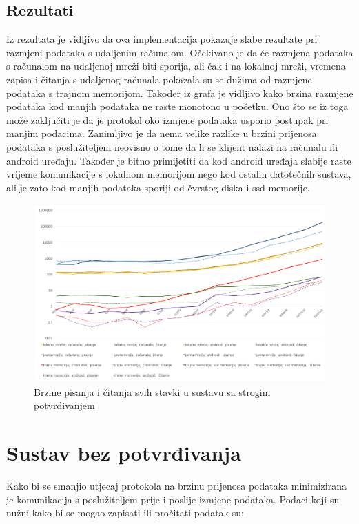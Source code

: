 \documentclass[times, utf8, zavrsni, square]{fer}
\begin{document}
\subsection{Rezultati}
Iz rezultata je vidljivo da ova implementacija pokazuje slabe rezultate pri razmjeni podataka s udaljenim računalom.
Očekivano je da će razmjena podataka s računalom na udaljenoj mreži biti sporija, ali čak i na lokalnoj mreži, vremena zapisa i čitanja s udaljenog računala pokazala su se dužima od razmjene podataka s trajnom memorijom.
Također iz grafa je vidljivo kako brzina razmjene podataka kod manjih podataka ne raste monotono u početku. Ono što se iz toga može zaključiti je da je protokol oko izmjene podataka usporio postupak pri manjim podacima.
Zanimljivo je da nema velike razlike u brzini prijenosa podataka s poslužiteljem neovisno o tome da li se klijent nalazi na računalu ili android uređaju.
Također je bitno primijetiti da kod android uređaja slabije raste vrijeme komunikacije s lokalnom memorijom nego kod ostalih datotečnih sustava, ali je zato kod manjih podataka sporiji od čvrstog diska i ssd memorije.
\begin{figure}[h!]
    \centering
    \includegraphics[width=1.5\textwidth, angle = 90]{1_graf}
    \caption{Brzine pisanja i čitanja svih stavki u sustavu sa strogim potvrđivanjem}
    \label{fig:rez_1}
\end{figure}
\FloatBarrier
\section{Sustav bez potvrđivanja}
Kako bi se smanjio utjecaj protokola na brzinu prijenosa podataka minimizirana je komunikacija s poslužiteljem prije i poslije izmjene podataka.
Podaci koji su nužni kako bi se mogao zapisati ili pročitati podatak su:
\end{document}
